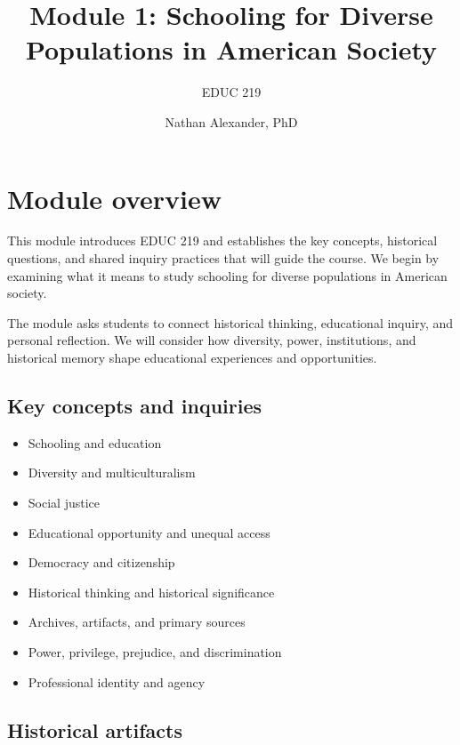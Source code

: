 \documentclass[
  letterpaper,
  DIV=11,
  numbers=noendperiod]{scrartcl}
\title{Module 1: Schooling for Diverse Populations in American Society}
\subtitle{EDUC 219}
\author{Nathan Alexander, PhD}
\date{}
\providecommand{\tightlist}{%
  \setlength{\itemsep}{0pt}\setlength{\parskip}{0pt}}\usepackage{longtable,booktabs,array}
\renewcommand*\contentsname{Table of contents}
\newcommand\contentsname{Table of contents}
\begin{document}
\maketitle

\renewcommand*\contentsname{Table of contents}
{
\hypersetup{linkcolor=}
\setcounter{tocdepth}{3}
\tableofcontents
}

\section{Module overview}\label{module-overview}

This module introduces EDUC 219 and establishes the key concepts,
historical questions, and shared inquiry practices that will guide the
course. We begin by examining what it means to study schooling for
diverse populations in American society.

The module asks students to connect historical thinking, educational
inquiry, and personal reflection. We will consider how diversity, power,
institutions, and historical memory shape educational experiences and
opportunities.

\subsection{Key concepts and
inquiries}\label{key-concepts-and-inquiries}

\begin{itemize}
\tightlist
\item
  Schooling and education
\item
  Diversity and multiculturalism
\item
  Social justice
\item
  Educational opportunity and unequal access
\item
  Democracy and citizenship
\item
  Historical thinking and historical significance
\item
  Archives, artifacts, and primary sources
\item
  Power, privilege, prejudice, and discrimination
\item
  Professional identity and agency
\end{itemize}

\subsection{Historical artifacts}\label{historical-artifacts}
\end{document}
